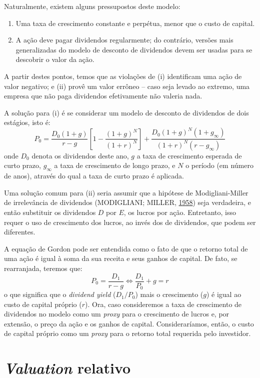 \documentclass[grad,numbers]{coppe}
\providecommand{\tightlist}{%
  \setlength{\itemsep}{0pt}\setlength{\parskip}{0pt}}
\begin{document}
  Naturalmente, existem alguns pressupostos deste modelo:
  \begin{enumerate}
  \def\labelenumi{\roman{enumi}.}
  \tightlist
  \item
    Uma taxa de crescimento constante e perpétua, menor que o custo de capital.
  \item
    A ação deve pagar dividendos regularmente; do contrário, versões mais generalizadas do modelo de desconto de dividendos devem ser usadas para se descobrir o valor da ação.
  \end{enumerate}
  A partir destes pontos, temos que as violações de (i) identificam uma ação de valor negativo; e (ii) provê um valor errôneo -- caso seja levado ao extremo, uma empresa que não paga dividendos efetivamente não valeria nada.

  A solução para (i) é se considerar um modelo de desconto de dividendos de dois estágios, isto é: \[
  P_0 = \frac{D_0 (1+g)}{r-g} \left[1 - \frac{(1+g)^N}{(1+r)^N}\right] + \frac{D_0 (1+g)^N (1+g_\infty)}{(1+r)^N (r-g_\infty)}
  \] onde \(D_0\) denota os dividendos deste ano, \(g\) a taxa de crescimento esperada de curto prazo, \(g_\infty\) a taxa de crescimento de longo prazo, e \(N\) o período (em número de anos), através do qual a taxa de curto prazo é aplicada.

  Uma solução comum para (ii) seria assumir que a hipótese de Modigliani-Miller de irrelevância de dividendos (MODIGLIANI; MILLER, \protect\hyperlink{ref-modigliani1958}{1958}) seja verdadeira, e então substituir os dividendos \(D\) por \(E\), os lucros por ação. Entretanto, isso requer o uso de crescimento dos lucros, ao invés dos de dividendos, que podem ser diferentes.

  A equação de Gordon pode ser entendida como o fato de que o retorno total de uma ação é igual à soma da sua receita e seus ganhos de capital. De fato, se rearranjada, teremos que: \[
  P_0 = \frac{D_1}{r-g} \iff \frac{D_1}{P_0} + g = r
  \] o que significa que o \emph{dividend yield} (\(D_1/P_0\)) mais o crescimento (\(g\)) é igual ao custo de capital próprio (\(r\)). Ora, caso consideremos a taxa de crescimento de dividendos no modelo como um \emph{proxy} para o crescimento de lucros e, por extensão, o preço da ação e os ganhos de capital. Consideraríamos, então, o custo de capital próprio como um \emph{proxy} para o retorno total requerida pelo investidor.

  \hypertarget{valuation-relativo}{%
  \section{\texorpdfstring{\emph{Valuation} relativo}{Valuation relativo}}\label{valuation-relativo}}
\end{document}
